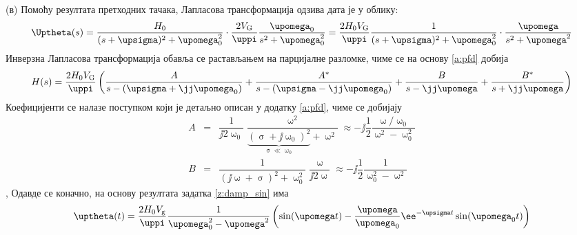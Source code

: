 (в) Помоћу резултата претходних тачака, Лапласова трансформација одзива дата је у облику: 
\begin{equation}
    \Uptheta(s) =
    \dfrac{H_0}{(s + \upsigma)^2 + \upomega_0^2}
    \cdot
    \dfrac{2 V_{\rm G}}{\uppi}
    \dfrac{\upomega_0 }{s^2 + \upomega_0^2}
    = 
    \dfrac{2 H_0 V_{\rm G}}{\uppi}
    \dfrac{1}{(s + \upsigma)^2 + \upomega_0^2}
    \cdot
    \dfrac{\upomega }{s^2 + \upomega^2}
\end{equation}
Инверзна Лапласова трансформација обавља се растављањем на парцијалне разломке, чиме се на основу \ref{a:pfd} добија 
\begin{equation}
    H(s) = 
    \dfrac{2 H_0 V_{\rm G}}{\uppi} \left(
    \dfrac{A}{ s - (\upsigma + \jj\upomega_0 ) } + \dfrac{A^\ast}{ s - (\upsigma - \jj\upomega_0 ) } 
    + \dfrac{B}{s - \jj\upomega} + \dfrac{B^*}{s + \jj\upomega}  
    \right)
\end{equation}
Коефицијенти се налазе поступком који је детаљно описан у додатку \ref{a:pfd}, чиме се добијају
\begin{eqnarray}
    A &=& \dfrac{1}{\jj2\upomega_0} \dfrac{\upomega^2}{ \underbrace{( \upsigma + \jj\upomega_0)^2}_{\upsigma \ll \upomega_0} + \upomega^2 }
   \approx 
   - \jj
   \dfrac{1}{2} \dfrac{\upomega/\upomega_0} { \upomega^2 - \upomega_0^2 } \\
   B &=& \dfrac{1}{ (\jj\upomega + \upsigma)^2 + \upomega_0^2 } \dfrac{\upomega}{\jj2\upomega}
   \approx
   - \jj 
   \dfrac{1}{2} 
   \dfrac{1}{\upomega_0^2 - \upomega^2}
\end{eqnarray},
Одавде се коначно, на основу резултата задатка \ref{z:damp_sin} има 
\begin{equation}
    \uptheta(t) = \dfrac{2 H_0 V_{\rm g}}{\uppi}
    \dfrac{1}{\upomega_0^2 - \upomega^2}
    \left(
        \sin(\upomega t )
        -
        \dfrac{\upomega}{\upomega_0} \ee^{-\upsigma t} \sin(\upomega_0 t )
    \right)
\end{equation}
